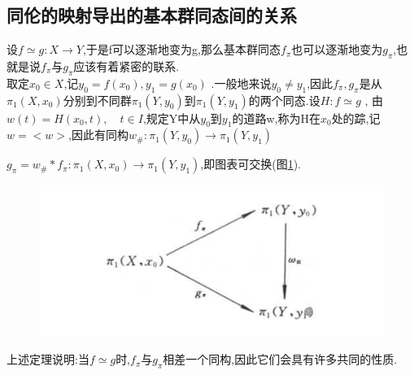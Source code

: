 \subsection*{同伦的映射导出的基本群同态间的关系}
设\(f \simeq g : X \rightarrow Y \),于是f可以逐渐地变为g,那么基本群同态\(f_{\pi}\)也可以逐渐地变为\(g_{\pi}\),也就是说\(f_{\pi}\)与\(g_{\pi}\)应该有着紧密的联系.
\\
取定\(x_0 \in X \),记\(y_0 =f(x_0), y_1 = g(x_0)\) .一般地来说\(y_0 \neq y_1 \),因此\(f_{\pi},g_{\pi}\)是从\(\pi_1 (X , x_0)\)分别到不同群\(\pi_1 (Y, y_0)\)到\(\pi_1 (Y,y_1)\)的两个同态.设\(H: f \simeq  g\) , 由\(w(t) = H(x_0 ,t) , \quad t \in I \),规定Y中从\(y_0\)到\(y_1\)的道路w,称为H在\(x_0\)处的踪,记\(w =<w>\),因此有同构\(w_{\#}: \pi_1 (Y,y_0) \rightarrow \pi_1 (Y,y_1)\)
\begin{theorem}
    \(g_{\pi}=w_{\#} * f_{\pi} : \pi_1 (X,x_0) \rightarrow \pi_1 (Y,y_1)\),即图表可交换(图\ref{fig:enter-label_26}).
    \begin{figure}[H]
        \centering
        \includegraphics[width=0.5\linewidth]{image_26.png}
        \caption{}
        \label{fig:enter-label_26}
    \end{figure}
\end{theorem}
上述定理说明:当\(f \simeq g \)时,\(f_{\pi}\)与\(g_{\pi}\)相差一个同构,因此它们会具有许多共同的性质.
